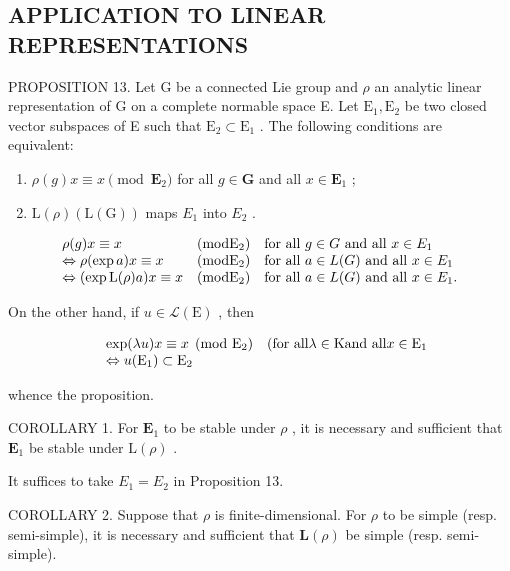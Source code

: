 \subsection{APPLICATION TO LINEAR REPRESENTATIONS}

PROPOSITION 13. Let G be a connected Lie group and \(\rho\) an analytic linear representation of G on a complete normable space E. Let \(\mathrm{E}_1, \mathrm{E}_2\) be two closed vector subspaces of E such that \(\mathrm{E}_2 \subset \mathrm{E}_1\) . The following conditions are equivalent:

\begin{enumerate}
\def\labelenumi{(\roman{enumi})}
\item
  \(\rho(g)x \equiv x \pmod{\mathbf{E}_2}\) for all \(g \in \mathbf{G}\) and all \(x \in \mathbf{E}_1\) ;
\item
  \(\mathrm{L}(\rho)(\mathrm{L}(\mathrm{G}))\) maps \(E_{1}\) into \(E_{2}\) .
\end{enumerate}

\[
\begin{array}{l l l} \rho (g) x \equiv x & (\mathrm{mod} \mathrm{E} _ {2}) & \text {for all \(g\in G\) and all \(x\in E_{1}\)} \\ \Leftrightarrow \rho (\exp a) x \equiv x & (\mathrm{mod} \mathrm{E} _ {2}) & \text {for all \(a\in L(G)\) and all \(x\in E_{1}\)} \\ \Leftrightarrow (\exp \mathrm{L} (\rho) a) x \equiv x & (\mathrm{mod} \mathrm{E} _ {2}) & \text {for all \(a\in L(G)\) and all \(x\in E_{1}\)}. \end{array}
\]

On the other hand, if \(u \in \mathcal{L}(\mathrm{E})\) , then

\[
\begin{array}{r l} & \exp (\lambda u) x \equiv x \pmod {\mathrm{E} _ {2}} \quad \text {(for all} \lambda \in \mathrm{K} \text {and all} x \in \mathrm{E} _ {1} \\ & \Leftrightarrow u (\mathrm{E} _ {1}) \subset \mathrm{E} _ {2} \end{array}
\]

whence the proposition.

COROLLARY 1. For \(\mathbf{E}_1\) to be stable under \(\rho\) , it is necessary and sufficient that \(\mathbf{E}_1\) be stable under \(\mathrm{L}(\rho)\) .

It suffices to take \(E_{1} = E_{2}\) in Proposition 13.

COROLLARY 2. Suppose that \(\rho\) is finite-dimensional. For \(\rho\) to be simple (resp. semi-simple), it is necessary and sufficient that \(\mathbf{L}(\rho)\) be simple (resp. semi-simple).

